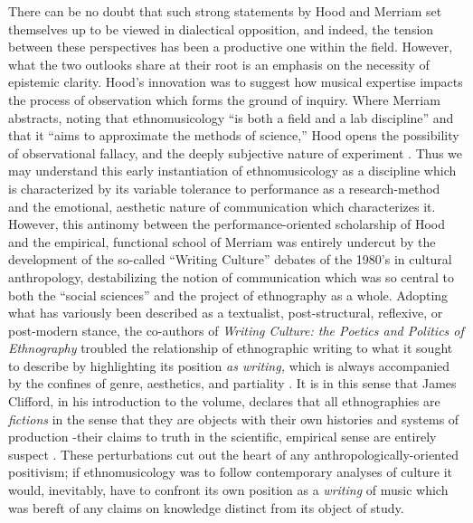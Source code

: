There can be no doubt that such strong statements by Hood and Merriam
set themselves up to be viewed in dialectical opposition, and indeed,
the tension between these perspectives has been a productive one within
the field. However, what the two outlooks share at their root is an
emphasis on the necessity of epistemic clarity. Hood's innovation was to
suggest how musical expertise impacts the process of observation which
forms the ground of inquiry. Where Merriam abstracts, noting that
ethnomusicology ``is both a field and a lab discipline'' and that it
``aims to approximate the methods of science,'' Hood opens the
possibility of observational fallacy, and the deeply subjective nature
of experiment \autocite*[37]{merriam_anthropology_1964}. Thus we may
understand this early instantiation of ethnomusicology as a discipline
which is characterized by its variable tolerance to performance as a
research-method and the emotional, aesthetic nature of communication
which characterizes it. However, this antinomy between the
performance-oriented scholarship of Hood and the empirical, functional
school of Merriam was entirely undercut by the development of the
so-called ``Writing Culture'' debates of the 1980's in cultural
anthropology, destabilizing the notion of communication which was so
central to both the ``social sciences'' and the project of ethnography
as a whole. Adopting what has variously been described as a textualist,
post-structural, reflexive, or post-modern stance, the co-authors of
\emph{Writing Culture: the Poetics and Politics of Ethnography} troubled
the relationship of ethnographic writing to what it sought to describe
by highlighting its position \emph{as writing,} which is always
accompanied by the confines of genre, aesthetics, and partiality
\autocite{zenker_writing_2014}. It is in this sense that James Clifford,
in his introduction to the volume, declares that all ethnographies are
\emph{fictions} in the sense that they are objects with their own
histories and systems of production -their claims to truth in the
scientific, empirical sense are entirely suspect
\autocite[6]{clifford_introduction:_1986}. These perturbations cut out
the heart of any anthropologically-oriented positivism; if
ethnomusicology was to follow contemporary analyses of culture it would,
inevitably, have to confront its own position as a \emph{writing} of
music which was bereft of any claims on knowledge distinct from its
object of study.

